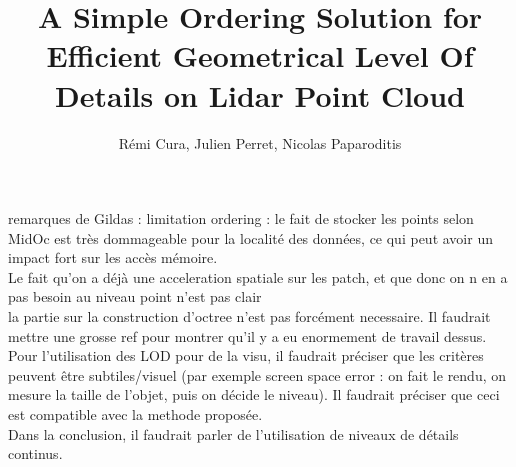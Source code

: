 
	

\title{ A Simple Ordering Solution for Efficient Geometrical Level Of Details on Lidar Point Cloud}
\author{R\'emi Cura, Julien Perret, Nicolas Paparoditis}



\maketitle
\newpage
 
remarques de Gildas :
limitation ordering : le fait de stocker les points selon MidOc est très dommageable pour la localité des données, ce qui peut avoir un impact fort sur les accès mémoire.
\\
Le fait qu'on a déjà une acceleration spatiale sur les patch, et que donc on n en a pas besoin au niveau point n'est pas clair
\\
la partie sur la construction d'octree n'est pas forcément necessaire. Il faudrait mettre une grosse ref pour montrer qu'il y a eu enormement de travail dessus.
\\
Pour l'utilisation des LOD pour de la visu, il faudrait préciser que les critères peuvent être subtiles/visuel (par exemple screen space error : on fait le rendu, on mesure la taille de l'objet, puis on décide le niveau). Il faudrait préciser que ceci est compatible avec la methode proposée.
\\
Dans la conclusion, il faudrait parler de l'utilisation de niveaux de détails continus.


	

	

	
	
	

	

	

